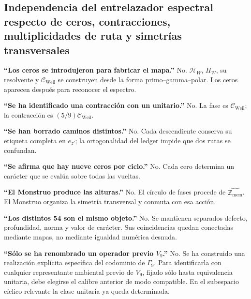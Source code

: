\subsection{Independencia del entrelazador espectral respecto de ceros, contracciones, multiplicidades de ruta y simetrías transversales}
\textbf{“Los ceros se introdujeron para fabricar el mapa.”} No. \(\mathcal H_W\), \(H_W\), su resolvente y \(\mathcal C_{\mathrm{Weil}}\) se construyen desde la forma primo–gamma–polar. Los ceros aparecen después para reconocer el espectro.\par
\textbf{“Se ha identificado una contracción con un unitario.”} No. La fase es \(\mathcal C_{\mathrm{Weil}}\); la contracción es \((5/9)\mathcal C_{\mathrm{Weil}}\).\par
\textbf{“Se han borrado caminos distintos.”} No. Cada descendiente conserva su etiqueta completa en \(e_{z'}\); la ortogonalidad del ledger impide que dos rutas se confundan.\par
\textbf{“Se afirma que hay nueve ceros por ciclo.”} No. Cada cero determina un carácter que se evalúa sobre todas las vueltas.\par
\textbf{“El Monstruo produce las alturas.”} No. El círculo de fases procede de \(\widehat{\mathbb Z_{\mathrm{mem}}}\). El Monstruo organiza la simetría transversal y conmuta con esa acción.\par
\textbf{“Los distintos 54 son el mismo objeto.”} No. Se mantienen separados defecto, profundidad, norma y valor de carácter. Sus coincidencias quedan conectadas mediante mapas, no mediante igualdad numérica desnuda.\par
\textbf{“Sólo se ha renombrado un operador previo \(V_9\).”} No. Se ha construido una realización explícita específica del codominio de \(\Gamma_9\). Para identificarla con cualquier representante ambiental previo de \(V_9\), fijado sólo hasta equivalencia unitaria, debe elegirse el calibre anterior de modo compatible. En el subespacio cíclico relevante la clase unitaria ya queda determinada.\par
{}
